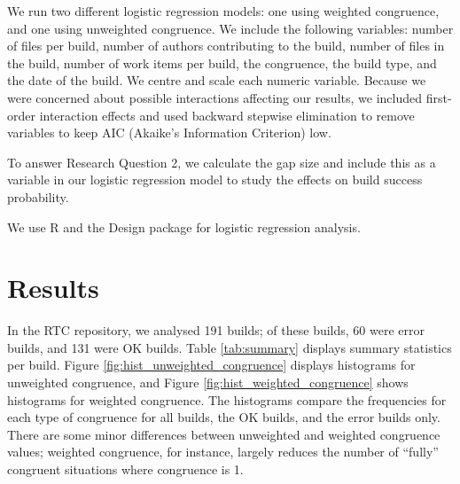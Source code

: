 \documentclass[12pt,oneside]{book}
\begin{document}
We run two different logistic regression models: one using weighted congruence, and one using unweighted congruence. We include the following variables: number of files per build, number of authors contributing to the build, number of files in the build, number of work items per build, the congruence, the build type, and the date of the build. We centre and scale each numeric variable.
Because we were concerned about possible interactions affecting our results, we included first-order interaction effects and used backward stepwise elimination to remove variables to keep AIC (Akaike's Information Criterion) low.



To answer Research Question 2, we calculate the gap size and include this as a variable in our logistic regression model to study the effects on build success probability.


We use R \cite{R} and the Design package \cite{designR} for logistic regression analysis.



\section{Results}
\label{sec:results}

In the RTC repository, we analysed 191 builds; of these builds, 60 were error builds, and 131 were OK builds. Table \ref{tab:summary} displays summary statistics per build.
Figure \ref{fig:hist_unweighted_congruence} displays histograms for unweighted congruence, and Figure \ref{fig:hist_weighted_congruence} shows histograms for weighted congruence. The histograms compare the frequencies for each type of congruence for all builds, the OK builds, and the error builds only. There are some minor differences between unweighted and weighted congruence values; weighted congruence, for instance, largely reduces the number of ``fully'' congruent situations where congruence is 1.
\end{document}

